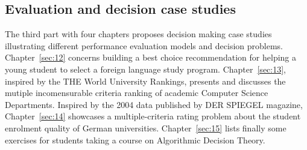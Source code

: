 % 
%
%

\begin{partbacktext}
\part{Evaluation and decision case studies}
\noindent The third part with four chapters proposes decision making case studies illustrating different performance evaluation models and decision problems. Chapter~\ref{sec:12} concerns building a best choice recommendation for helping a young student to select a foreign language study program. Chapter~\ref{sec:13}, inspired by the THE World University Rankings, presents and discusses the mutiple incomensurable criteria ranking of academic Computer Science Departments. Inspired by the 2004 data published by DER SPIEGEL magazine, Chapter~\ref{sec:14} showcases a multiple-criteria rating problem about the student enrolment quality of German universities. Chapter~\ref{sec:15} lists finally some exercises for students taking a course on Algorithmic Decision Theory. 
\end{partbacktext}